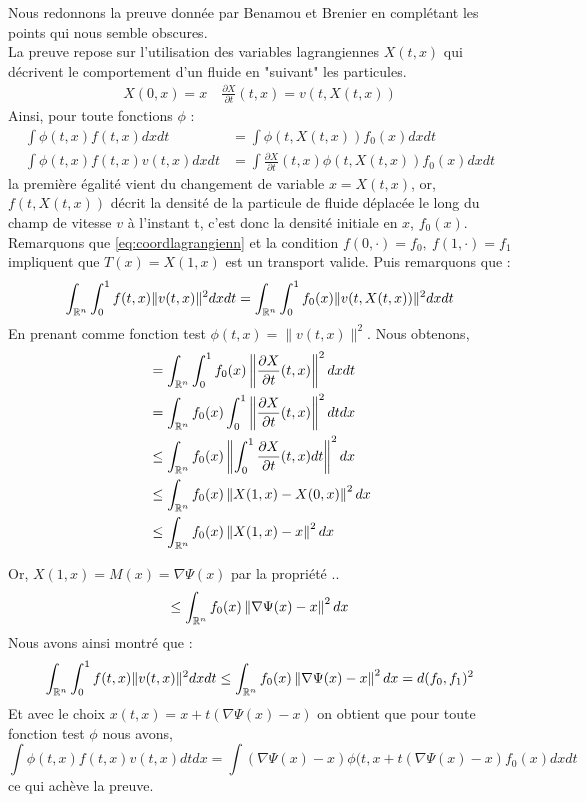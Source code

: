\documentclass[a4paper,12pt]{article}
\begin{document}
\begin{preuve}
Nous redonnons la preuve donnée par Benamou et Brenier en complétant les points qui nous semble obscures.\\
La preuve repose sur l'utilisation des variables lagrangiennes $X(t,x)$ qui décrivent le comportement d'un fluide en "suivant" les particules. 
\begin{align*}
X(0,x)=x\quad\frac{\partial X}{\partial t}(t,x) = v(t,X(t,x))
\end{align*}
Ainsi, pour toute fonctions $\phi$ :
\begin{align}
\int \phi(t,x)f(t,x) dxdt &=\int \phi(t,X(t,x))f_0(x)dxdt \label{eq:coordlagrangienn}\\ 
\int \phi(t,x)f(t,x)v(t,x) dxdt &= \int \frac{\partial X}{\partial t}(t,x)\phi(t,X(t,x))f_0(x)dxdt \nonumber
\end{align}
la première égalité vient du changement de variable $x=X(t,x)$, or, $f(t,X(t,x))$ décrit la densité de la particule de fluide déplacée le long du champ de vitesse $v$ à l'instant t, c'est donc la densité initiale en $x$, $f_0(x)$. \\

Remarquons que \eqref{eq:coordlagrangienn} et la condition $f(0,\cdot)=f_0,\ f(1,\cdot) = f_1$ impliquent que $T(x)=X(1,x)$ est un transport valide. Puis remarquons que : 
$$
\int_{\mathbb{R}^n}\int_0^1 f(t,x)\|v(t,x)\|^2dxdt = \int_{\mathbb{R}^n}\int_0^1 f_0(x)\|v(t,X(t,x))\|^2dxdt
$$
En prenant comme fonction test $\phi(t,x) = \|v(t,x)\|^2$. Nous obtenons, 
\begin{align*}
&= \int_{\mathbb{R}^n}\int_0^1  f_0(x)\left\|\frac{\partial X}{\partial t} (t,x)\right\|^2dxdt \\
&= \int_{\mathbb{R}^n} f_0(x)\int_0^1 \left\|\frac{\partial X}{\partial t} (t,x)\right\|^2dtdx\\
&\leq \int_{\mathbb{R}^n} f_0(x)\left\|\int_0^1\frac{\partial X}{\partial t} (t,x) dt \right\|^2dx \\
&\leq \int_{\mathbb{R}^n} f_0(x)\left\| X(1,x)-X(0,x) \right\|^2dx \\
&\leq \int_{\mathbb{R}^n} f_0(x)\left\| X(1,x)-x \right\|^2dx \\
\end{align*}

Or, $X(1,x) = M(x) =\nabla\Psi(x)$ par la propriété .. 
$$
\leq \int_{\mathbb{R}^n} f_0(x)\left\| \nabla\Psi(x)-x \right\|^2dx
$$
Nous avons ainsi montré que : 
$$
\int_{\mathbb{R}^n}\int_0^1 f(t,x)\|v(t,x)\|^2dxdt \leq \int_{\mathbb{R}^n} f_0(x)\left\| \nabla\Psi(x)-x \right\|^2dx = d(f_0,f_1)^2
$$
Et avec le choix $x(t,x) = x+t(\nabla\Psi(x)-x)$ on obtient que pour toute fonction test $\phi$ nous avons, 
$$
\int \phi(t,x)f(t,x)v(t,x)dtdx =\int (\nabla\Psi(x) -x)\phi(t,x+t(\nabla\Psi(x)-x)f_0(x)dxdt
$$
ce qui achève la preuve. 
\end{preuve}
\end{document}
